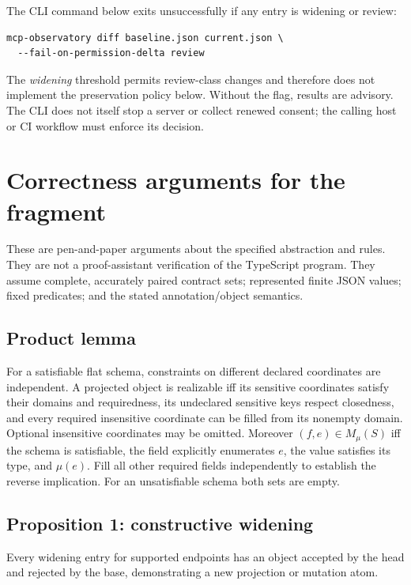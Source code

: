 The CLI command below exits unsuccessfully if any entry is widening or review:

\begin{verbatim}
mcp-observatory diff baseline.json current.json \
  --fail-on-permission-delta review
\end{verbatim}

The \emph{widening} threshold permits review-class changes and therefore does not implement the preservation policy below. Without the flag, results are advisory. The CLI does not itself stop a server or collect renewed consent; the calling host or CI workflow must enforce its decision.

\section{Correctness arguments for the fragment}\label{correctness-arguments-for-the-fragment}

These are pen-and-paper arguments about the specified abstraction and rules. They are not a proof-assistant verification of the TypeScript program. They assume complete, accurately paired contract sets; represented finite JSON values; fixed predicates; and the stated annotation/object semantics.

\subsection{Product lemma}\label{product-lemma}

For a satisfiable flat schema, constraints on different declared coordinates are independent. A projected object is realizable iff its sensitive coordinates satisfy their domains and requiredness, its undeclared sensitive keys respect closedness, and every required insensitive coordinate can be filled from its nonempty domain. Optional insensitive coordinates may be omitted. Moreover \((f,e)\in M_\mu(S)\) iff the schema is satisfiable, the field explicitly enumerates \(e\), the value satisfies its type, and \(\mu(e)\). Fill all other required fields independently to establish the reverse implication. For an unsatisfiable schema both sets are empty.

\subsection{Proposition 1: constructive widening}\label{proposition-1-constructive-widening}

Every widening entry for supported endpoints has an object accepted by the head and rejected by the base, demonstrating a new projection or mutation atom.

